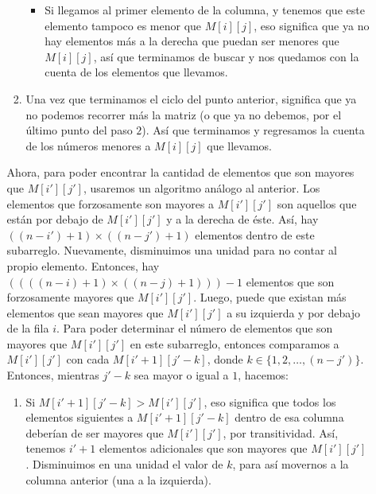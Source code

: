 \documentclass[letterpaper,11pt]{article}
\begin{document}
\begin{enumerate}
\begin{enumerate}
\begin{enumerate}
\begin{itemize}
                \item Si llegamos al primer elemento de la columna, y tenemos 
                que este elemento tampoco es menor que $M[i][j]$, eso significa 
                que ya no hay elementos más a la derecha que puedan ser menores 
                que $M[i][j]$, así que terminamos de buscar y nos quedamos con 
                la cuenta de los elementos que llevamos. 
            \end{itemize}

            \item Una vez que terminamos el ciclo del punto anterior, significa 
            que ya no podemos recorrer más la matriz (o que ya no debemos, por 
            el último punto del paso $2$). Así que terminamos y regresamos la 
            cuenta de los números menores a $M[i][j]$ que llevamos.
        \end{enumerate}

        Ahora, para poder encontrar la cantidad de elementos que son mayores que
        $M[i'][j']$, usaremos un algoritmo análogo al anterior. Los elementos que 
        forzosamente son mayores a $M[i'][j']$ son aquellos que están por debajo 
        de $M[i'][j']$ y a la derecha de éste. Así, hay $((n-i')+1) \times 
        ((n-j')+1)$ elementos dentro de este subarreglo. Nuevamente, disminuimos 
        una unidad para no contar al propio elemento. Entonces, hay 
        $((((n-i)+1) \times ((n-j) + 1)))-1$ elementos que son forzosamente
        mayores que $M[i'][j']$. Luego, puede que existan más elementos que 
        sean mayores que $M[i'][j']$ a su izquierda y por debajo de la fila 
        $i$. Para poder determinar el número de elementos que son mayores 
        que $M[i'][j']$ en este subarreglo, entonces comparamos a $M[i'][j']$
        con cada $M[i'+1][j'-k]$, donde $k \in \{1, 2, \ldots, (n-j')\}$. 
        Entonces, mientras $j'-k$ sea mayor o igual a $1$, hacemos:  
        \begin{enumerate}
            \item Si $M[i'+1][j'-k] > M[i'][j']$, eso significa que todos los 
            elementos siguientes a $M[i'+1][j'-k]$ dentro de esa columna 
            deberían de ser mayores que $M[i'][j']$, por transitividad. Así, 
            tenemos $i'+1$ elementos adicionales que son mayores que $M[i'][j']$. 
            Disminuimos en una unidad el valor de $k$, para así movernos a la 
            columna anterior (una a la izquierda).


\end{enumerate}
\end{enumerate}
\end{enumerate}
\end{document}
